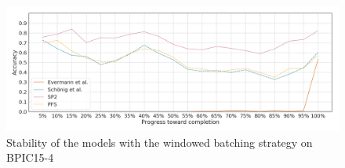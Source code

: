 \begin{figure}[!htb]
    \centering
    \includegraphics[width=\textwidth]{gfx/bpic2015_4/windowed_stability.png}
    \caption{Stability of the models with the windowed batching strategy on BPIC15-4}
    \label{fig:bpic15-4-windowed-stability}
\end{figure}

\FloatBarrier
